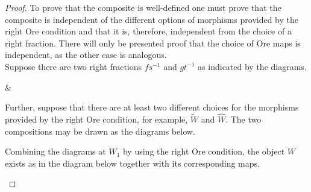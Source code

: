     \begin{proof}
        To prove that the composite is well-defined one must prove that the composite is independent of the different options of morphisms provided by the right Ore condition and that it is, therefore, independent from the choice of a right fraction. There will only be presented proof that the choice of Ore maps is independent, as the other case is analogous. \\

        Suppose there are two right fractions $fs^{-1}$ and $gt^{-1}$ as indicated by the diagrams.

        \begin{center}
            \&
        \end{center}
        Further, suppose that there are at least two different choices for the morphisms provided by the right Ore condition, for example, $\widetilde{W}$ and $\widehat{W}$. The two compositions may be drawn as the diagrams below.
        \begin{center}
        \end{center}
        Combining the diagrams at $W_1$ by using the right Ore condition, the object $W$ exists as in the diagram below together with its corresponding maps. 
        \begin{center}
\end{center}
\end{proof}

